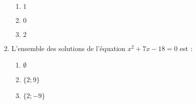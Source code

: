 \documentclass[oneside,twocolumn,landscape]{book}
\begin{document}
\begin{enumerate}
\begin{enumerate}

\item\BonneReponse $1$

\item\MauvaiseReponse $0$


\item\MauvaiseReponse $2$

\end{enumerate}



\item L'ensemble des solutions de l'équation $x^{2}+7 x-18=0$ est :

\begin{enumerate}

\item\MauvaiseReponse $\emptyset$


\item\MauvaiseReponse $\{2 ; 9\}$

\item\BonneReponse $\{2 ;-9\}$

\end{enumerate}








\end{enumerate}
\end{document}
